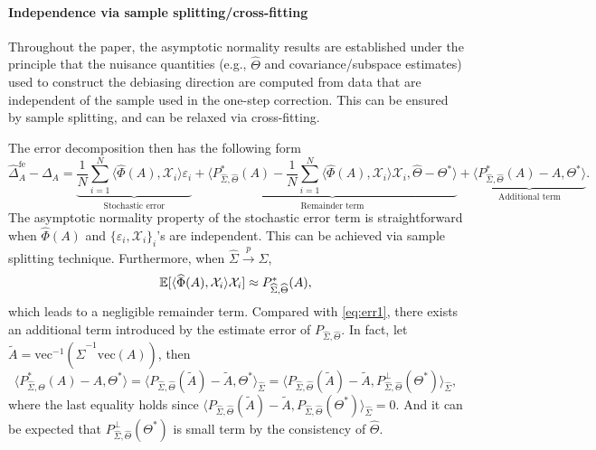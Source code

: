 \documentclass[authoryear,preprint,review,12pt]{elsarticle}
\begin{document}
	\paragraph{Independence via sample splitting/cross-fitting}
	Throughout the paper, the asymptotic normality results are established under the principle that
	the nuisance quantities (e.g., $\widehat\Theta$ and covariance/subspace estimates) used to construct
	the debiasing direction are computed from data that are independent of the sample used in the
	one-step correction. This can be ensured by sample splitting, and can be relaxed via cross-fitting.
	
	The error decomposition then has the following form
	\begin{equation}
		\widehat{\Delta}_A^{\mathrm{fe}} - {\Delta}_A  = \underbrace{\frac{1}{N} \sum_{i=1}^N \langle \widehat{\Phi}(A), \mathcal{X}_i \rangle \varepsilon_i}_{\text{Stochastic error}}
		+ \underbrace{\big\langle P_{\widehat{\Sigma},\widehat{\Theta}}^\ast(A) -   \frac{1}{N} \sum_{i=1}^N \langle  \widehat{\Phi}(A), \mathcal{X}_i \rangle     \mathcal{X}_i,  \widehat{\Theta} - \Theta^\ast\big\rangle}_{\text{Remainder term}} + \underbrace{\langle   P_{\widehat{\Sigma},\widehat{\Theta}}^\ast(A) - A, \Theta^\ast\rangle}_{\text{Additional term}}.
		\label{eq:feasible_err}
	\end{equation}
	The asymptotic normality property of the stochastic error term is straightforward when $\widehat\Phi(A)$ and $\{\varepsilon_i, \mathcal{X}_i\}_i$'s are independent. This can be achieved via sample splitting technique. Furthermore, when $\widehat\Sigma \stackrel{p}{\rightarrow} \Sigma$,
	$$\mathbb{E}[ \langle  \widehat{\Phi}(A), \mathcal{X}_i \rangle     \mathcal{X}_i] \approx P_{\widehat{\Sigma},\widehat{\Theta}}^\ast(A),$$
	which leads to a negligible remainder term. 
	Compared with \eqref{eq:err1}, there exists an additional term introduced by the estimate error of $P_{\widehat{\Sigma},\widehat{\Theta}}$. In fact, let $\widetilde A = \mathrm{vec}^{-1}(\widehat\Sigma^{-1}\mathrm{vec}(A))$, then
	\[ \langle P_{\widehat{\Sigma},\widehat{\Theta}}^\ast(A) - A, \Theta^\ast\rangle= \langle P_{\widehat\Sigma, \widehat\Theta }(\widetilde A) - \widetilde A, \Theta^\ast\rangle_{\widehat\Sigma} = \langle P_{\widehat\Sigma, \widehat\Theta }(\widetilde A) - \widetilde A, P_{\widehat\Sigma, \widehat\Theta }^{\perp}(\Theta^\ast) \rangle_{\widehat\Sigma},\]
	where the last equality holds since $\langle P_{\widehat\Sigma, \widehat\Theta }(\widetilde A) - \widetilde A, P_{\widehat\Sigma, \widehat\Theta } (\Theta^\ast) \rangle_{\widehat\Sigma}  = 0.$ And it can be expected that $P_{\widehat\Sigma, \widehat\Theta }^{\perp}(\Theta^\ast)$ is small term by the consistency of $\widehat\Theta$.
	
\end{document}
